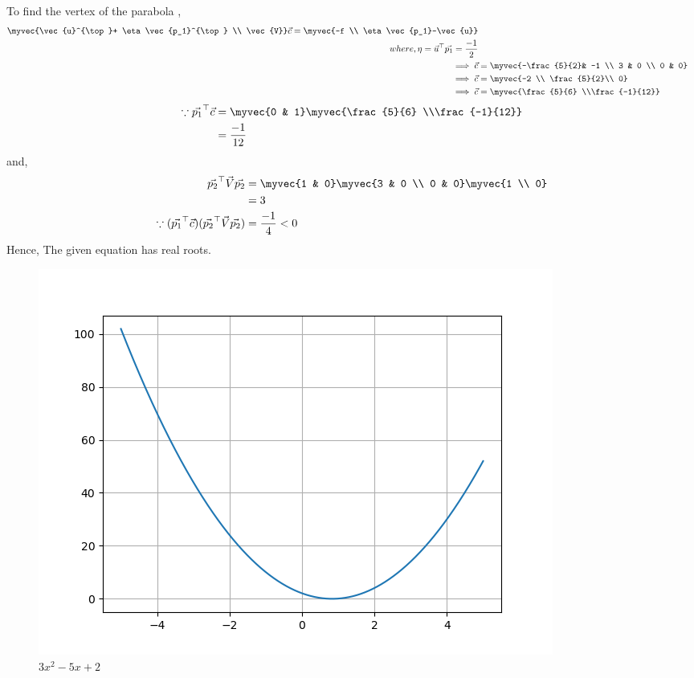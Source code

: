 To find the vertex of the parabola ,
\begin{align}
    \myvec{\vec{u}^{\top}+ \eta \vec{p_1}^{\top} \\ \vec{V}}\vec{c} = \myvec{-f \\ \eta \vec{p_1}-\vec{u}}\\
    where, \eta = \vec{u}^{\top}\vec{p_1}= \frac{-1}{2}\\
    \implies
    \vec{c}&=\myvec{-\frac{5}{2}& -1 \\ 3 & 0 \\ 0 & 0}\\ \implies \vec{c}& = \myvec{-2 \\ \frac{5}{2}\\ 0}\\ \implies
    \vec{c}&=\myvec{\frac{5}{6} \\\frac{-1}{12}}
\end{align}
\begin{align}
    \because \vec{p_1}^{\top}\vec{c} &= \myvec{0 & 1}\myvec{\frac{5}{6} \\\frac{-1}{12}}\\
    &= \frac{-1}{12}
\end{align}
and,
\begin{align}
    \vec{p_2}^{\top}\vec{V}\vec{p_2}&= \myvec{1 & 0}\myvec{3 & 0 \\ 0 & 0}\myvec{1 \\ 0}\\
    &= 3\\
    \because (\vec{p_1}^{\top}\vec{c}) (\vec{p_2}^{\top}\vec{V}\vec{p_2})&=\frac{-1}{4}<0 
\end{align}
Hence, The given equation has real roots.\\
\begin{figure}[htp]
    \centering
    \includegraphics[width=\columnwidth]{solutions/oct/2/21/Figures/Figure_1.png}
    \caption{$3x^2-5x+2$}
\end{figure}
